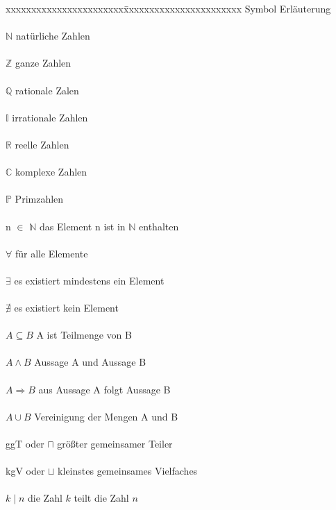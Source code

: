 \documentclass[12pt,a4paper]{article}
\theoremstyle{definition}
\begin{document}
\begin{tabbing}
xxxxxxxxxxxxxxxxxxxxxxx\=xxxxxxxxxxxxxxxxxxxxxxx\kill
\large Symbol             \> \large Erläuterung\\
\\$\mathbb{N}$            \> natürliche Zahlen\\
\\$\mathbb{Z}$            \> ganze Zahlen\\
\\$\mathbb{Q}$            \> rationale Zalen\\
\\$\mathbb{I}$            \> irrationale Zahlen\\
\\$\mathbb{R}$            \> reelle Zahlen\\
\\$\mathbb{C}$            \> komplexe Zahlen\\
\\$\mathbb{P}$            \> Primzahlen\\
\\n $\in$ $\mathbb{N}$    \> das Element n ist in $\mathbb{N}$ enthalten\\
\\$\forall$               \> für alle Elemente\\
\\$\exists$               \> es existiert mindestens ein Element\\
\\$\nexists$              \> es existiert kein Element\\
\\$A \subseteq B$         \> A ist Teilmenge von B\\
\\$A \land B $            \> Aussage A und Aussage B\\
\\$A \Rightarrow B $      \> aus Aussage A folgt Aussage B\\
\\$A \cup B$              \> Vereinigung der Mengen A und B\\
\\ggT  oder $\sqcap$      \> größter gemeinsamer Teiler\\
\\kgV  oder $\sqcup$      \> kleinstes gemeinsames Vielfaches\\
\\$k \mid n$              \> die Zahl $k$ teilt die Zahl $n$\\

\end{tabbing}
\end{document}
